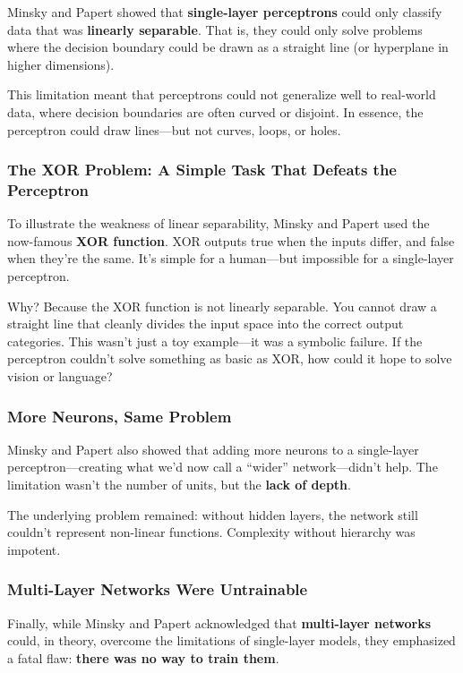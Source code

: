 Minsky and Papert showed that \textbf{single-layer perceptrons} could only classify data that was \textbf{linearly separable}. That is, they could only solve problems where the decision boundary could be drawn as a straight line (or hyperplane in higher dimensions).

This limitation meant that perceptrons could not generalize well to real-world data, where decision boundaries are often curved or disjoint. In essence, the perceptron could draw lines—but not curves, loops, or holes.

\subsubsection{The XOR Problem: A Simple Task That Defeats the Perceptron}

To illustrate the weakness of linear separability, Minsky and Papert used the now-famous \textbf{XOR function}. XOR outputs true when the inputs differ, and false when they’re the same. It’s simple for a human—but impossible for a single-layer perceptron.

Why? Because the XOR function is not linearly separable. You cannot draw a straight line that cleanly divides the input space into the correct output categories. This wasn’t just a toy example—it was a symbolic failure. If the perceptron couldn’t solve something as basic as XOR, how could it hope to solve vision or language?

\subsubsection{More Neurons, Same Problem}

Minsky and Papert also showed that adding more neurons to a single-layer perceptron—creating what we’d now call a “wider” network—didn’t help. The limitation wasn’t the number of units, but the \textbf{lack of depth}.

The underlying problem remained: without hidden layers, the network still couldn’t represent non-linear functions. Complexity without hierarchy was impotent.

\subsubsection{Multi-Layer Networks Were Untrainable}

Finally, while Minsky and Papert acknowledged that \textbf{multi-layer networks} could, in theory, overcome the limitations of single-layer models, they emphasized a fatal flaw: \textbf{there was no way to train them}.

